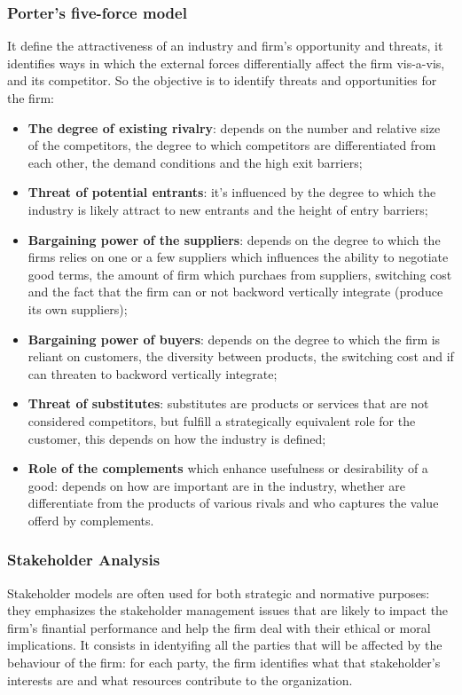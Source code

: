 \documentclass[12pt]{article}
\begin{document}
\subsubsection{Porter's five-force model}
It define the attractiveness of an industry and firm's opportunity and threats, it identifies ways in which the external forces differentially affect the firm vis-a-vis, and its competitor.
So the objective is to identify threats and opportunities for the firm:
\begin{itemize}
    \item \textbf{The degree of existing rivalry}: depends on the number and relative size of the competitors, the degree to which competitors are differentiated from each other, the demand conditions and the high exit barriers;
    \item \textbf{Threat of potential entrants}: it's influenced by the degree to which the industry is likely attract to new entrants and the height of entry barriers;
    \item \textbf{Bargaining power of the suppliers}: depends on the degree to which the firms relies on one or a few suppliers which influences the ability to negotiate good terms, the amount of firm which purchaes from suppliers, switching cost and the fact that the firm can or not backword vertically integrate (produce its own suppliers);
    \item \textbf{Bargaining power of buyers}: depends on the degree to which the firm is reliant on customers, the diversity between products, the switching cost and if can threaten to backword vertically integrate; 
    \item \textbf{Threat of substitutes}: substitutes are products or services that are not considered competitors, but fulfill a strategically equivalent role for the customer, this depends on how the industry is defined;
    \item \textbf{Role of the complements} which enhance usefulness or desirability of a good: depends on how are important are in the industry, whether are differentiate from the products of various rivals and who captures the value offerd by complements. 
\end{itemize}
\subsubsection{Stakeholder Analysis}
Stakeholder models are often used for both strategic and normative purposes: they emphasizes the stakeholder management issues that are likely to impact the firm's finantial performance and help the firm deal with their ethical or moral implications.
It consists in identyifing all the parties that will be affected by the behaviour of the firm: for each party, the firm identifies what that stakeholder's interests are and what resources contribute to the organization.
\end{document}
